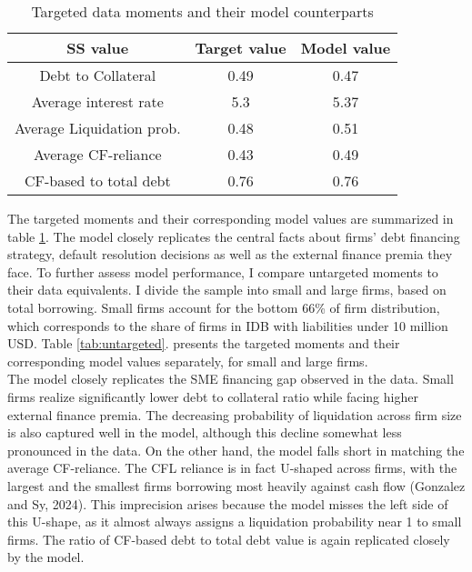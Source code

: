 \documentclass[12pt]{article}
\begin{document}
\begin{table}[h!]
    \centering
    \begin{tabular}{c|c|c}
    \toprule
    \textbf{SS value} & \textbf{Target value} & \textbf{Model value} \\ 
    \midrule
    Debt to Collateral & 0.49 & 0.47 \\ 
    Average interest rate & 5.3 & 5.37 \\ 
    Average Liquidation prob. & 0.48 & 0.51 \\ 
    Average CF-reliance & 0.43 & 0.49 \\ 
   CF-based to total debt & 0.76 & 0.76 \\ 
    \bottomrule
    \end{tabular}
    \caption{Targeted data moments and their model counterparts}
    \label{tab:targets}
\end{table}

\noindent The targeted moments and their corresponding model values are summarized in table \ref{tab:targets}. The model closely replicates the central facts about firms' debt financing strategy, default resolution decisions as well as the external finance premia they face. To further assess model performance, I compare untargeted moments to their data equivalents. I divide the sample into small and large firms, based on total borrowing. Small firms account for the bottom 66\% of firm distribution, which corresponds to the share of firms in IDB with liabilities under 10 million USD. Table \ref{tab:untargeted}. presents the targeted moments and their corresponding model values separately, for small and large firms.\vspace{3mm} \\
\noindent The model closely replicates the SME financing gap observed in the data. Small firms realize significantly lower debt to collateral ratio while facing higher external finance premia. The decreasing probability of liquidation across firm size is also captured well in the model, although this decline somewhat less pronounced in the data. On the other hand, the model falls short in matching the average CF-reliance. The CFL reliance is in fact U-shaped across firms, with the largest and the smallest firms borrowing most heavily against cash flow (Gonzalez and Sy, 2024). This imprecision arises because the model misses the left side of this U-shape, as it almost always assigns a liquidation probability near 1 to small firms. The ratio of CF-based debt to total debt value is again replicated closely by the model. 
\end{document}

